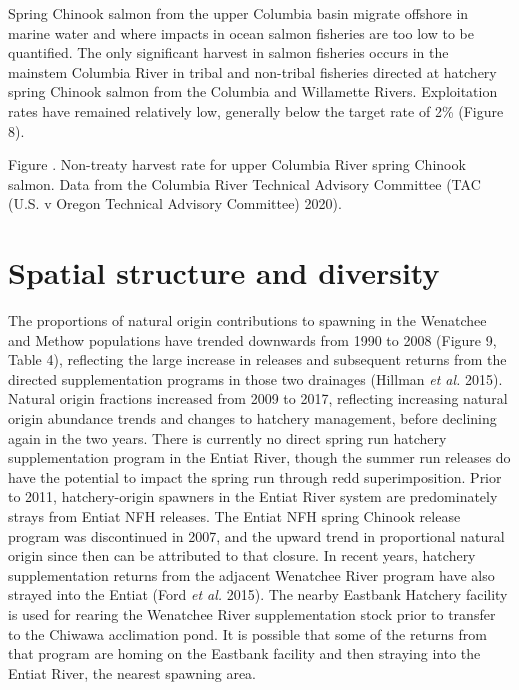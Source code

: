 \documentclass[
  letterpaper,
  oneside,
  open=any]{scrbook}
\begin{document}
Spring Chinook salmon from the upper Columbia basin migrate offshore in
marine water and where impacts in ocean salmon fisheries are too low to
be quantified. The only significant harvest in salmon fisheries occurs
in the mainstem Columbia River in tribal and non-tribal fisheries
directed at hatchery spring Chinook salmon from the Columbia and
Willamette Rivers. Exploitation rates have remained relatively low,
generally below the target rate of 2\% (Figure 8).

Figure . Non-treaty harvest rate for upper Columbia River spring Chinook
salmon. Data from the Columbia River Technical Advisory Committee (TAC
(U.S. v Oregon Technical Advisory Committee) 2020).

\hypertarget{spatial-structure-and-diversity-1}{%
\section{Spatial structure and
diversity}\label{spatial-structure-and-diversity-1}}

The proportions of natural origin contributions to spawning in the
Wenatchee and Methow populations have trended downwards from 1990 to
2008 (Figure 9, Table 4), reflecting the large increase in releases and
subsequent returns from the directed supplementation programs in those
two drainages (Hillman \emph{et al.} 2015). Natural origin fractions
increased from 2009 to 2017, reflecting increasing natural origin
abundance trends and changes to hatchery management, before declining
again in the two years. There is currently no direct spring run hatchery
supplementation program in the Entiat River, though the summer run
releases do have the potential to impact the spring run through redd
superimposition. Prior to 2011, hatchery-origin spawners in the Entiat
River system are predominately strays from Entiat NFH releases. The
Entiat NFH spring Chinook release program was discontinued in 2007, and
the upward trend in proportional natural origin since then can be
attributed to that closure. In recent years, hatchery supplementation
returns from the adjacent Wenatchee River program have also strayed into
the Entiat (Ford \emph{et al.} 2015). The nearby Eastbank Hatchery
facility is used for rearing the Wenatchee River supplementation stock
prior to transfer to the Chiwawa acclimation pond. It is possible that
some of the returns from that program are homing on the Eastbank
facility and then straying into the Entiat River, the nearest spawning
area.
\end{document}
